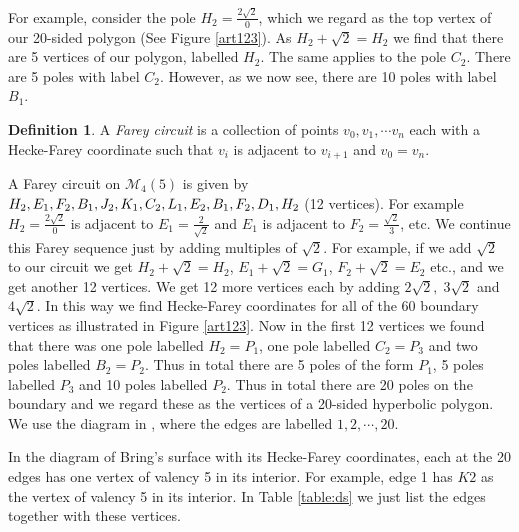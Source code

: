 \documentclass{amsproc}
\numberwithin{equation}{section}
\numberwithin{equation}{section}
\theoremstyle{definition}
\newtheorem{definition}[theorem]{Definition}
\theoremstyle{remark}
\numberwithin{equation}{section}
\begin{document}
For example, consider the pole $H_2=\frac{2\sqrt 2}{0}$, which we regard as the top vertex of our 20-sided polygon (See Figure \ref{art123}).  As $H_2+\sqrt 2=H_2$ we find that there are 5 vertices of our polygon, labelled $H_2.$  
The same applies to the pole $C_2$. There are 5 poles with label $C_2.$ However,  as we now see, there are 10 poles with label $B_1$.

\begin{definition} A  {\it Farey circuit}  is a collection of points $v_0, v_1,\cdots v_n$ each with a Hecke-Farey coordinate such that $v_i$ is adjacent to $v_{i+1}$ and $v_0=v_n.$

\end{definition}



A Farey circuit on $\mathscr{M}_4(5)$ is given by $H_2,  E_1, F_2, B_1, J_2, K_1, C_2, L_1, E_2, B_1,\\ F_2, D_1, H_2$ (12 vertices). For example $H_2=\frac{2\sqrt 2}{0}$ is adjacent to $E_1=\frac{2}{\sqrt 2}$ and $E_1$ is adjacent to $F_2=\frac{\sqrt 2}{3}$, etc.  We continue this Farey sequence  just by adding multiples of  $\sqrt 2.$ For example, if we add  $\sqrt 2$ to our circuit  we get $H_2+\sqrt 2=H_2$,  $E_1+\sqrt 2=G_1$, $F_2+\sqrt 2=E_2$ etc., and we  get another 12 vertices. We get 12 more vertices each by adding $2\sqrt 2, \;3\sqrt 2$ and $4\sqrt 2$. In  this way we find Hecke-Farey  coordinates for all of the  60 boundary vertices as illustrated in Figure \ref{art123}.  Now in the first 12 vertices we found that there was one pole labelled $H_2=P_1$, one pole labelled $C_2=P_3$  and two poles labelled $B_2=P_2$.  Thus in total there are 5 poles of the form $P_1$, 5 poles labelled $ P_3$ and 10 poles labelled $P_2$. Thus in total there are 20 poles on the boundary and we regard these as the vertices of a 20-sided hyperbolic polygon. We use the diagram in \cite{BN12}, where the edges are labelled $1,2,\cdots , 20.$

In the diagram of Bring's surface with its  Hecke-Farey coordinates, each at the 20 edges has one vertex of valency 5 in its interior.
 For example, edge 1 has $K2$ as the vertex of valency 5 in its interior. In Table \ref{table:ds} we just list the edges together with these vertices.
 
\end{document}
